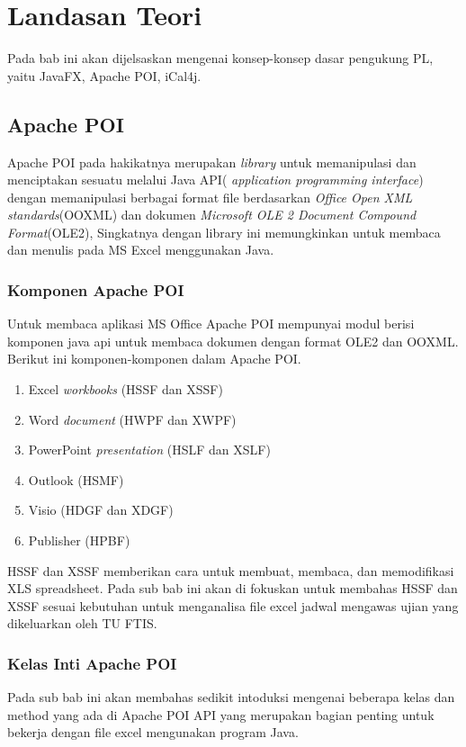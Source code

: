 \chapter{Landasan Teori}
\label{chap:teori}
Pada bab ini akan dijelsaskan mengenai konsep-konsep dasar pengukung PL, yaitu JavaFX, Apache POI, iCal4j.

\section{Apache POI}
\label{sec:apache} 

Apache POI pada hakikatnya merupakan \textit{library} untuk memanipulasi dan menciptakan sesuatu melalui Java API( \textit{application programming interface}) dengan memanipulasi berbagai format file berdasarkan \textit{Office Open XML standards}(OOXML) dan dokumen \textit{Microsoft OLE 2 Document Compound Format}(OLE2), Singkatnya dengan library ini memungkinkan untuk membaca dan menulis pada MS Excel menggunakan Java.\cite{apachepoi} \\


\subsection{Komponen Apache POI}
\label{subs:komponen} 
Untuk membaca aplikasi MS Office Apache POI mempunyai modul berisi komponen java api untuk membaca dokumen dengan format OLE2 dan OOXML. Berikut ini komponen-komponen dalam Apache POI.\cite{apachepoi}  

\begin{enumerate}
	\item Excel \textit{workbooks} (HSSF dan XSSF)
	\item Word \textit{document} (HWPF dan XWPF)
	\item PowerPoint \textit{presentation} (HSLF dan XSLF)
	\item Outlook (HSMF)
	\item Visio (HDGF dan XDGF)
	\item Publisher (HPBF)
\end{enumerate}

HSSF dan XSSF memberikan cara untuk membuat, membaca, dan memodifikasi XLS spreadsheet. Pada sub bab ini akan di fokuskan untuk membahas HSSF dan XSSF sesuai kebutuhan untuk menganalisa file excel jadwal mengawas ujian yang dikeluarkan oleh TU FTIS.\cite{apachepoi}


\subsection{Kelas Inti Apache POI}
\label{subs:kelas_inti}  
Pada sub bab ini akan membahas sedikit intoduksi mengenai beberapa kelas dan method yang ada di Apache POI API yang merupakan bagian penting untuk bekerja dengan file excel mengunakan program Java.\cite{apachepoi2}

